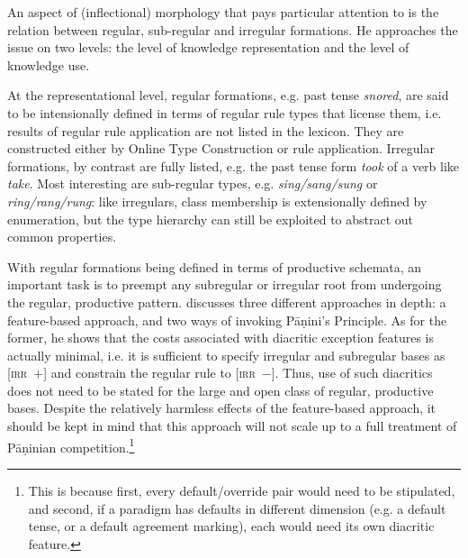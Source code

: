 An aspect of (inflectional) morphology that \citet{Koenig99} pays
particular attention to is the relation between regular, sub-regular
and irregular formations. He approaches the issue on two levels: the
level of knowledge representation and the level of knowledge use. 

At the representational level, regular formations, e.g. past tense
\textit{snored}, are said to be intensionally defined in terms of
regular rule types that license them, i.e. results of regular rule
application are not listed in the lexicon. They are constructed either
by Online Type Construction or rule application.  Irregular
formations, by contrast are fully listed, e.g. the past tense form
\textit{took} of a verb like \textit{take}. Most interesting are
sub-regular types, e.g. \textit{sing/sang/sung} or
\textit{ring/rang/rung}: like irregulars, class membership is
extensionally defined by enumeration, but the type hierarchy can still
be exploited to abstract out common properties.

With regular formations being defined in terms of productive schemata,
an important task is to preempt any subregular or irregular root from
undergoing the regular, productive pattern. \citet{Koenig99} discusses
three different approaches in depth: a feature-based approach, and two
ways of invoking Pāṇini's Principle. As for the former, he shows that
the costs associated with diacritic exception features is actually
minimal, i.e. it is sufficient to specify irregular and subregular
bases as \textsc{[irr~$+$]} and constrain the regular rule to
\textsc{[irr~$-$]}. Thus, use of such diacritics does not need to be
stated for the large and open class of regular, productive
bases. Despite the relatively harmless effects of the feature-based
approach, it should be kept in mind that this approach will not scale
up to a full treatment of Pāṇinian competition.\footnote{This is
  because first, every default/override pair would need to be
  stipulated, and second, if a paradigm has defaults in different
  dimension (e.g. a default tense, or a default agreement marking),
  each would need its own diacritic feature.}

